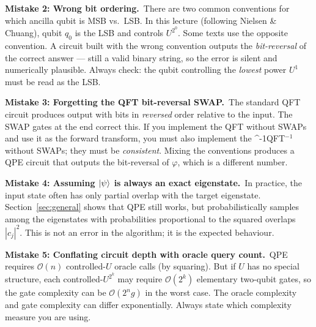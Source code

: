 \documentclass[12pt,a4paper]{article}
\newcommand{\QPE}{\textsc{QPE}}
\newcommand{\IQFT}{\ifmmode \text{\textsc{QFT}}^{-1}\else \textsc{QFT}$^{-1}$\fi}
\newcommand{\bigO}{\mathcal{O}}
\begin{document}
\begin{tcolorbox}[warning]
  \textbf{Mistake 2: Wrong bit ordering.}\ There are two common conventions
  for which ancilla qubit is MSB vs.\ LSB.  In this lecture (following
  Nielsen \& Chuang), qubit $q_0$ is the LSB and controls $U^{2^0}$.
  Some texts use the opposite convention.  A circuit built with the wrong
  convention outputs the \emph{bit-reversal} of the correct answer — still a
  valid binary string, so the error is silent and numerically plausible.
  Always check: the qubit controlling the \emph{lowest} power $U^1$ must
  be read as the LSB.
\end{tcolorbox}

\begin{tcolorbox}[warning]
  \textbf{Mistake 3: Forgetting the QFT bit-reversal SWAP.}\ The standard
  QFT circuit produces output with bits in \emph{reversed} order relative to
  the input.  The SWAP gates at the end correct this.  If you implement the
  QFT without SWAPs and use it as the forward transform, you must also
  implement the \IQFT{} without SWAPs; they must be \emph{consistent}.
  Mixing the conventions produces a QPE circuit that outputs the bit-reversal
  of $\varphi$, which is a different number.
\end{tcolorbox}

\begin{tcolorbox}[warning]
  \textbf{Mistake 4: Assuming $\Ket{\psi}$ is always an exact eigenstate.}\
  In practice, the input state often has only partial overlap with the target
  eigenstate.  Section~\ref{sec:general} shows that \QPE{} still works, but
  probabilistically samples among the eigenstates with probabilities
  proportional to the squared overlaps $|c_j|^2$.  This is not an error in
  the algorithm; it is the expected behaviour.
\end{tcolorbox}

\begin{tcolorbox}[warning]
  \textbf{Mistake 5: Conflating circuit depth with oracle query count.}\
  \QPE{} requires $\bigO(n)$ controlled-$U$ oracle calls (by squaring).
  But if $U$ has no special structure, each controlled-$U^{2^k}$ may
  require $\bigO(2^k)$ elementary two-qubit gates, so the gate complexity
  can be $\bigO(2^n g)$ in the worst case.  The oracle complexity and gate
  complexity can differ exponentially.  Always state which complexity
  measure you are using.
\end{tcolorbox}

\newpage
\end{document}
